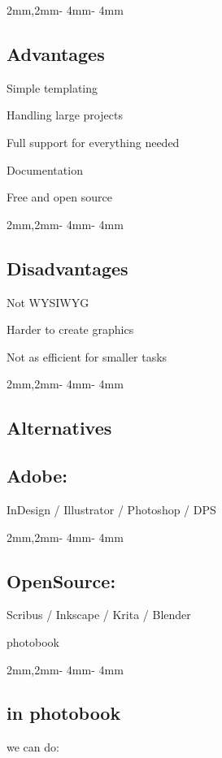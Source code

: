 \documentclass[
	layoutmode=block,
	blockwidth=96mm, blockheight=108mm,
	bleed=0mm,
	bindingoffset=0mm,
	imageblockwidth=0.98, imageblockheight=0.98,
	imageblockoffsettop=0mm,
	12pt,final,openany
]{photobook}
\newcommand\PageFushRightC[1]{
	\begin{page}
		\begin{cell}{2mm,2mm}{\paperwidth - 4mm}{\paperheight - 4mm}
			\null
			\vfill
			\begin{flushright}
				#1
			\end{flushright}
			\vfill
			\null
		\end{cell}
	\end{page}}
\newcommand\PageFushLeftC[1]{
	\begin{page}
		\begin{cell}{2mm,2mm}{\paperwidth - 4mm}{\paperheight - 4mm}
			\null
			\vfill
			\begin{flushleft}
				#1
			\end{flushleft}
			\vfill
			\null
		\end{cell}
	\end{page}}
\begin{document}
\newcommand\seppoints{%
	\par
	\vspace{0.1em}}
\PageFushRightC{
	\section*{Advantages}
	Simple templating
	\seppoints
	Handling large projects
	\seppoints
	Full support for everything needed
	\seppoints
	Documentation
	\seppoints
	Free and open source
}
\PageFushLeftC{
	\vspace{-0.5em}
	\section*{Disadvantages}
	Not WYSIWYG
	\seppoints
	Harder to create graphics
	\seppoints
	Not as efficient for smaller tasks
}



\PageFushRightC{
	\section*{Alternatives}
	\vspace{1em}
	\subsection*{Adobe:}
	\vspace{-.7em}
	InDesign / Illustrator / Photoshop / DPS }
\PageFushLeftC{
	\vspace{-0.5em}
	\subsection*{OpenSource:}
	\vspace{-.7em}
	Scribus / Inkscape / Krita / Blender }



\begin{spreadtopages}
	\vfill
	\begin{center}
		\fontsize{42pt}{45pt}\selectfont
		photobook
	\end{center}
	\vfill
\end{spreadtopages}



\PageFushRightC{
	\section*{in photobook}
	\vspace{-7mm}
	we can do:}
\end{document}
